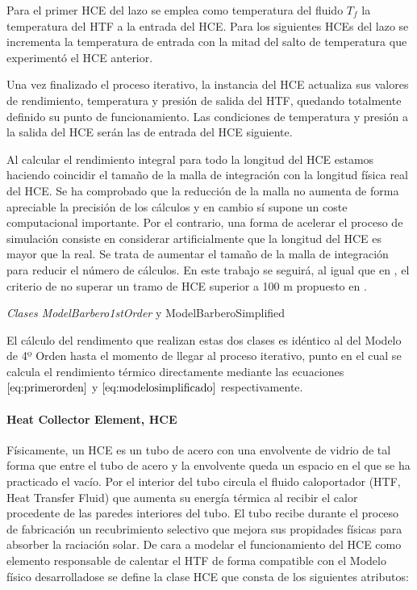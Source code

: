 Para el primer HCE del lazo se emplea como temperatura del fluido
\(T_f\) la temperatura del HTF a la entrada del HCE. Para los siguientes
HCEs del lazo se incrementa la temperatura de entrada con la mitad del
salto de temperatura que experimentó el HCE anterior.

Una vez finalizado el proceso iterativo, la instancia del HCE actualiza
sus valores de rendimiento, temperatura y presión de salida del HTF,
quedando totalmente definido su punto de funcionamiento. Las condiciones
de temperatura y presión a la salida del HCE serán las de entrada del
HCE siguiente.

Al calcular el rendimiento integral para todo la longitud del HCE
estamos haciendo coincidir el tamaño de la malla de integración con la
longitud física real del HCE. Se ha comprobado que la reducción de la
malla no aumenta de forma apreciable la precisión de los cálculos y en
cambio sí supone un coste computacional importante. Por el contrario,
una forma de acelerar el proceso de simulación consiste en considerar
artificialmente que la longitud del HCE es mayor que la real. Se trata
de aumentar el tamaño de la malla de integración para reducir el número
de cálculos. En este trabajo se seguirá, al igual que en
\cite{1022085/7TD8VTGL}, el criterio de no superar un tramo de HCE
superior a 100 m propuesto en \cite{1022085/CYH3NJEG}.

\emph{Clases ModelBarbero1stOrder} y ModelBarberoSimplified

El cálculo del rendimento que realizan estas dos clases es idéntico al
del Modelo de 4º Orden hasta el momento de llegar al proceso iterativo,
punto en el cual se calcula el rendimiento térmico directamente mediante
las ecuaciones \(\eqref{eq:primerorden}\) y
\(\eqref{eq:modelosimplificado}\) respectivamente.

\hypertarget{heat-collector-element-hce}{%
\paragraph{Heat Collector Element,
HCE}\label{heat-collector-element-hce}}

Físicamente, un HCE es un tubo de acero con una envolvente de vidrio de
tal forma que entre el tubo de acero y la envolvente queda un espacio en
el que se ha practicado el vacío. Por el interior del tubo circula el
fluido caloportador (HTF, Heat Transfer Fluid) que aumenta su energía
térmica al recibir el calor procedente de las paredes interiores del
tubo. El tubo recibe durante el proceso de fabricación un recubrimiento
selectivo que mejora sus propidades físicas para absorber la raciación
solar. De cara a modelar el funcionamiento del HCE como elemento
responsable de calentar el HTF de forma compatible con el Modelo físico
desarrolladose se define la clase HCE que consta de los siguientes
atributos:

